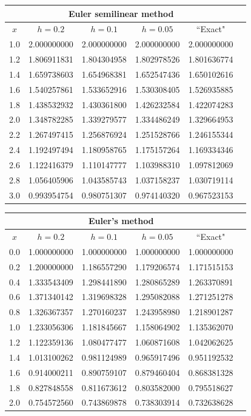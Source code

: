 \documentclass[dvips]{book}
\renewcommand{\exer}[1]{\par\medskip\;\noindent{\color{red}\bf #1.}}
\numberwithin{example}{section}
\numberwithin{equation}{section}
\numberwithin{theorem}{section}
\numberwithin{table}{section}
\numberwithin{figure}{section}
\begin{document}
{\small
\begin{tabular}{|c|r|r|r|r|r|}
\hline
\multicolumn{5}{|c|}{Euler semilinear method}\\\hline
\multicolumn{1}{|c|}{$x$}&
\multicolumn{1}{|c|}{$h=0.2$}&
\multicolumn{1}{|c|}{$h=0.1$}&
\multicolumn{1}{|c|}{$h=0.05$}&
\multicolumn{1}{|c|}{``Exact"}\\ \hline
1.0 & 2.000000000 & 2.000000000 & 2.000000000 & 2.000000000 \\
1.2 & 1.806911831 & 1.804304958 & 1.802978526 & 1.801636774 \\
1.4 & 1.659738603 & 1.654968381 & 1.652547436 & 1.650102616 \\
1.6 & 1.540257861 & 1.533652916 & 1.530308405 & 1.526935885 \\
1.8 & 1.438532932 & 1.430361800 & 1.426232584 & 1.422074283 \\
2.0 & 1.348782285 & 1.339279577 & 1.334486249 & 1.329664953 \\
2.2 & 1.267497415 & 1.256876924 & 1.251528766 & 1.246155344 \\
2.4 & 1.192497494 & 1.180958765 & 1.175157264 & 1.169334346 \\
2.6 & 1.122416379 & 1.110147777 & 1.103988310 & 1.097812069 \\
2.8 & 1.056405906 & 1.043585743 & 1.037158237 & 1.030719114 \\
3.0 & 0.993954754 & 0.980751307 & 0.974140320 & 0.967523153 \\
\hline
\end{tabular}}


\exer{3.1.18}
{\small
\begin{tabular}{|c|r|r|r|r|r|}
\hline
\multicolumn{5}{|c|}{Euler's method}\\\hline
\multicolumn{1}{|c|}{$x$}&
\multicolumn{1}{|c|}{$h=0.2$}&
\multicolumn{1}{|c|}{$h=0.1$}&
\multicolumn{1}{|c|}{$h=0.05$}&
\multicolumn{1}{|c|}{``Exact"}\\ \hline
0.0 & 1.000000000 & 1.000000000 & 1.000000000 & 1.000000000 \\
0.2 & 1.200000000 & 1.186557290 & 1.179206574 & 1.171515153 \\
0.4 & 1.333543409 & 1.298441890 & 1.280865289 & 1.263370891 \\
0.6 & 1.371340142 & 1.319698328 & 1.295082088 & 1.271251278 \\
0.8 & 1.326367357 & 1.270160237 & 1.243958980 & 1.218901287 \\
1.0 & 1.233056306 & 1.181845667 & 1.158064902 & 1.135362070 \\
1.2 & 1.122359136 & 1.080477477 & 1.060871608 & 1.042062625 \\
1.4 & 1.013100262 & 0.981124989 & 0.965917496 & 0.951192532 \\
1.6 & 0.914000211 & 0.890759107 & 0.879460404 & 0.868381328 \\
1.8 & 0.827848558 & 0.811673612 & 0.803582000 & 0.795518627 \\
2.0 & 0.754572560 & 0.743869878 & 0.738303914 & 0.732638628 \\
\hline
\end{tabular}}
\end{document}
